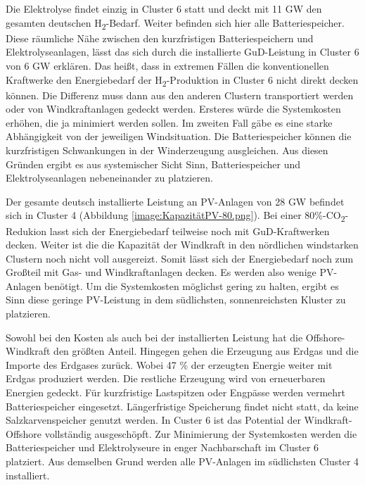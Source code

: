 Die Elektrolyse findet einzig in Cluster 6 statt und deckt mit 11 GW den gesamten deutschen H\textsubscript{2}-Bedarf. Weiter befinden sich hier alle Batteriespeicher. Diese räumliche Nähe zwischen den kurzfristigen Batteriespeichern und Elektrolyseanlagen, lässt das sich durch die installierte GuD-Leistung in Cluster 6 von 6 GW erklären. Das heißt, dass in extremen Fällen die konventionellen Kraftwerke den Energiebedarf der H\textsubscript{2}-Produktion in Cluster 6 nicht direkt decken können. Die Differenz muss dann aus den anderen Clustern transportiert werden oder von Windkraftanlagen gedeckt werden. Ersteres würde die Systemkosten erhöhen, die ja minimiert werden sollen. Im zweiten Fall gäbe es eine starke Abhängigkeit von der jeweiligen Windsituation. Die Batteriespeicher können die kurzfristigen Schwankungen in der Winderzeugung ausgleichen. Aus diesen Gründen ergibt es aus systemischer Sicht Sinn, Batteriespeicher und Elektrolyseanlagen nebeneinander zu platzieren. 


Der gesamte deutsch installierte Leistung an PV-Anlagen von 28 GW befindet sich in Cluster 4 (Abbildung \ref{image:KapazitätPV-80.png}). Bei einer 80\%-CO\textsubscript{2}-Redukion lasst sich der Energiebedarf teilweise noch mit GuD-Kraftwerken decken. Weiter ist die die Kapazität der Windkraft in den nördlichen windstarken Clustern noch nicht voll ausgereizt. Somit lässt sich der Energiebedarf noch zum Großteil mit Gas- und Windkraftanlagen decken. Es werden also wenige PV-Anlagen benötigt. Um die Systemkosten möglichst gering zu halten, ergibt es Sinn diese geringe PV-Leistung in dem südlichsten, sonnenreichsten Kluster zu platzieren. 

Sowohl bei den Kosten als auch bei der installierten Leistung hat die Offshore-Windkraft den größten Anteil. Hingegen gehen die Erzeugung aus Erdgas und die Importe des Erdgases zurück. Wobei 47 \% der erzeugten Energie weiter mit Erdgas produziert werden. Die restliche Erzeugung wird von erneuerbaren Energien gedeckt. Für kurzfristige Lastspitzen oder Engpässe werden vermehrt Batteriespeicher eingesetzt. Längerfristige Speicherung findet nicht statt, da keine Salzkarvenspeicher genutzt werden. In Custer 6 ist das Potential der Windkraft-Offshore vollständig ausgeschöpft. Zur Minimierung der Systemkosten werden die Batteriespeicher und Elektrolyseure in enger Nachbarschaft im Cluster 6 platziert. Aus demselben Grund werden alle PV-Anlagen im südlichsten Cluster 4 installiert.

